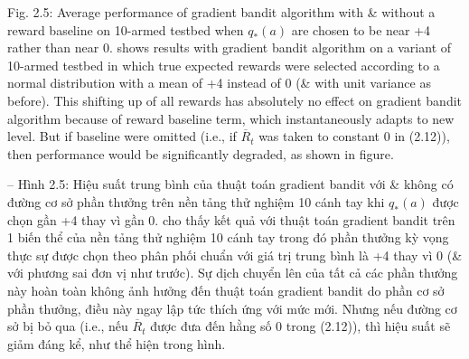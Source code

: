 \documentclass{article}
\begin{document}
\begin{itemize}
\begin{itemize}
        {\sf Fig. 2.5: Average performance of gradient bandit algorithm with \& without a reward baseline on 10-armed testbed when $q_*(a)$ are chosen to be near +4 rather than near 0.} shows results with gradient bandit algorithm on a variant of 10-armed testbed in which true expected rewards were selected according to a normal distribution with a mean of +4 instead of 0 (\& with unit variance as before). This shifting up of all rewards has absolutely no effect on gradient bandit algorithm because of reward baseline term, which instantaneously adapts to new level. But if baseline were omitted (i.e., if $\overline{R}_t$ was taken to constant 0 in (2.12)), then performance would be significantly degraded, as shown in figure.

        -- {\sf Hình 2.5: Hiệu suất trung bình của thuật toán gradient bandit với \& không có đường cơ sở phần thưởng trên nền tảng thử nghiệm 10 cánh tay khi $q_*(a)$ được chọn gần +4 thay vì gần 0.} cho thấy kết quả với thuật toán gradient bandit trên 1 biến thể của nền tảng thử nghiệm 10 cánh tay trong đó phần thưởng kỳ vọng thực sự được chọn theo phân phối chuẩn với giá trị trung bình là +4 thay vì 0 (\& với phương sai đơn vị như trước). Sự dịch chuyển lên của tất cả các phần thưởng này hoàn toàn không ảnh hưởng đến thuật toán gradient bandit do phần cơ sở phần thưởng, điều này ngay lập tức thích ứng với mức mới. Nhưng nếu đường cơ sở bị bỏ qua (i.e., nếu $\overline{R}_t$ được đưa đến hằng số 0 trong (2.12)), thì hiệu suất sẽ giảm đáng kể, như thể hiện trong hình.


\end{itemize}
\end{itemize}
\end{document}
